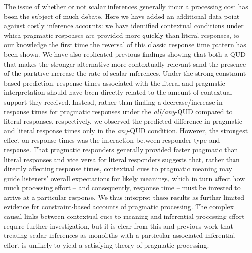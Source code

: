 \documentclass[10pt,letterpaper]{article}
\begin{document}
The issue of whether or not scalar inferences generally incur a processing cost has been the subject of much debate. Here we have added an additional data point against costly inference accounts: we have identified contextual conditions under which pragmatic responses are provided more quickly than literal responses, to our knowledge the first time the reversal of this classic response time pattern has been shown. We have also replicated previous findings showing that both a QUD that makes the stronger alternative more contextually relevant sand the presence of the partitive increase the rate of scalar inferences. Under the strong constraint-based prediction, response times associated with the literal and pragmatic interpretation should have been directly related to the amount of contextual support they received. Instead, rather than finding a decrease/increase in response times for pragmatic responses under the \emph{all/any}-QUD compared to literal responses, respectively, we observed the predicted difference in pragmatic and literal response times only in the \emph{any}-QUD condition. However, the strongest effect on response times was the interaction between responder type and response. That pragmatic responders generally provided faster pragmatic than literal responses and vice versa for literal responders suggests that, rather than directly affecting response times, contextual cues to pragmatic meaning may guide listeners' overall expectations for likely meanings, which in turn affect how much processing effort -- and consequently, response time -- must be invested to arrive at a particular response. We thus interpret these results as further limited evidence for constraint-based accounts of pragmatic processing. The complex causal links between contextual cues to meaning and inferential processing effort require further investigation, but it is clear from this and previous work that treating scalar inferences as monoliths with a particular associated inferential effort is unlikely to yield a satisfying theory of pragmatic processing.


\end{document}
